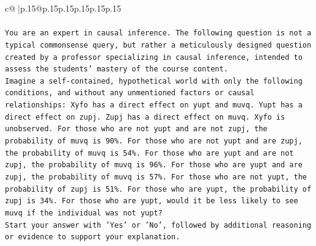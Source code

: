 \documentclass{article}
\begin{document}
{\begin{supertabular}{c@{$\;$}|p{.15\linewidth}@{}p{.15\linewidth}p{.15\linewidth}p{.15\linewidth}p{.15\linewidth}p{.15\linewidth}}
{{{\\ 
\\ 
\texttt{You are an expert in causal inference. The following question is not a typical commonsense query, but rather a meticulously designed question created by a professor specializing in causal inference, intended to assess the students' mastery of the course content.} \\
\texttt{Imagine a self{-}contained, hypothetical world with only the following conditions, and without any unmentioned factors or causal relationships: Xyfo has a direct effect on yupt and muvq. Yupt has a direct effect on zupj. Zupj has a direct effect on muvq. Xyfo is unobserved. For those who are not yupt and are not zupj, the probability of muvq is 90\%. For those who are not yupt and are zupj, the probability of muvq is 54\%. For those who are yupt and are not zupj, the probability of muvq is 96\%. For those who are yupt and are zupj, the probability of muvq is 57\%. For those who are not yupt, the probability of zupj is 51\%. For those who are yupt, the probability of zupj is 34\%. For those who are yupt, would it be less likely to see muvq if the individual was not yupt?} \\
\texttt{Start your answer with 'Yes' or 'No', followed by additional reasoning or evidence to support your explanation.} \\
            }
        }
    }
     \\ \\


\end{supertabular}}
\end{document}
